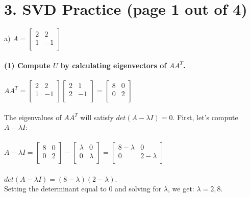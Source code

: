 \documentclass[11pt]{article}
\begin{document}
\section*{3. SVD Practice (page 1 out of 4)}
a) $ A = \begin{bmatrix}
2 & 2 \\
1 & -1 \\
\end{bmatrix} $ \\\\
\textbf{(1) Compute $U$ by calculating eigenvectors of $AA^T$.}
\\\\
$AA^T = \begin{bmatrix}
2 & 2 \\
1 & -1 \\
\end{bmatrix} \begin{bmatrix}
2 & 1 \\
2 & -1 \\
\end{bmatrix} = \begin{bmatrix}
8 & 0 \\
0 & 2 \\
\end{bmatrix} $ \\\\
The eigenvalues of $AA^T$ will satisfy $det(A - \lambda I ) = 0$. First, let's compute $A - \lambda I$: \\\\
$ A - \lambda I = \begin{bmatrix}
8 & 0 \\
0 & 2 \\
\end{bmatrix} - \begin{bmatrix}
\lambda & 0 \\
0 & \lambda \\
\end{bmatrix} = \begin{bmatrix}
8 - \lambda & 0 \\
0 & 2 - \lambda \\
\end{bmatrix}$ \\\\
$det(A - \lambda I) = (8 - \lambda) (2 - \lambda)$. \\
Setting the determinant equal to 0 and solving for $\lambda$, we get: $\lambda = 2, 8.$ \\\\
\end{document}
